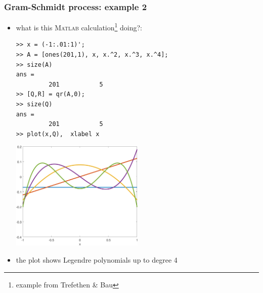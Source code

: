 \documentclass[10pt,hyperref]{beamer}
\newcommand{\Matlab}{\textsc{Matlab}\xspace}
\begin{document}
\begin{frame}[fragile]
\frametitle{Gram-Schmidt process: example 2}

\begin{itemize}
\item what is this \Matlab calculation\footnote{example from Trefethen \& Bau} doing?:

\medskip
\begin{Verbatim}[fontsize=\scriptsize]
>> x = (-1:.01:1)';
>> A = [ones(201,1), x, x.^2, x.^3, x.^4];
>> size(A)
ans =
         201           5
>> [Q,R] = qr(A,0);
>> size(Q)
ans =
         201           5
>> plot(x,Q),  xlabel x
\end{Verbatim}

\vspace{-15mm}
\hfill \includegraphics[width=0.5\textwidth]{figs/legendre} \quad 

\item the plot shows Legendre polynomials up to degree 4
\end{itemize}
\end{frame}
\end{document}
